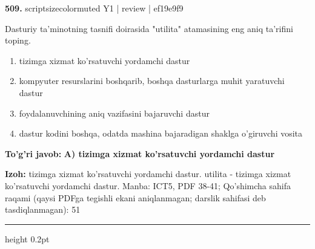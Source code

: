 \documentclass[10pt,a4paper]{article}
\begin{document}
{\bfseries\sffamily\color{ink} 509.} {scriptsizecolor{muted} Y1 | review | ef19e9f9}
\par
Dasturiy ta'minotning tasnifi doirasida "utilita" atamasining eng aniq ta'rifini toping.
\begin{enumerate}[label=\Alph*),leftmargin=9mm]
\item tizimga xizmat ko'rsatuvchi yordamchi dastur
\item kompyuter resurslarini boshqarib, boshqa dasturlarga muhit yaratuvchi dastur
\item foydalanuvchining aniq vazifasini bajaruvchi dastur
\item dastur kodini boshqa, odatda mashina bajaradigan shaklga o'giruvchi vosita
\end{enumerate}
\begin{tcolorbox}[enhanced,breakable,colback=teal!4,colframe=teal!60!black,boxrule=0.45pt,arc=1.2mm,left=2.7mm,right=2.7mm,top=1.8mm,bottom=1.8mm,before skip=2mm,after skip=2mm]
{\bfseries\sffamily\color{teal}To'g'ri javob:} \textbf{A) tizimga xizmat ko'rsatuvchi yordamchi dastur}
\par\smallskip
{\bfseries Izoh:} tizimga xizmat ko'rsatuvchi yordamchi dastur. utilita - tizimga xizmat ko'rsatuvchi yordamchi dastur. Manba: ICT5, PDF 38-41; Qo'shimcha sahifa raqami (qaysi PDFga tegishli ekani aniqlanmagan; darslik sahifasi deb tasdiqlanmagan): 51
\end{tcolorbox}
\vspace{2mm}\hrule height 0.2pt\vspace{3mm}
\end{document}
